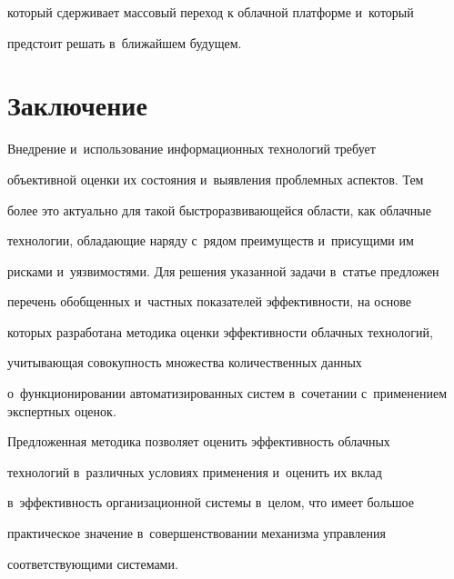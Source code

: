 который сдерживает массовый переход к облачной платформе и~который 

предстоит решать в~ближайшем будущем. 



\section{Заключение}



   Внедрение и~использование информационных технологий требует 

объективной оценки их состояния и~выявления проблемных аспектов. Тем 

более это актуально для такой быстроразвивающейся области, как облачные 

технологии, обладающие наряду с~рядом преимуществ и~присущими им 

рисками и~уязвимостями. Для решения указанной задачи в~статье предложен 

перечень обобщенных и~частных показателей эффективности, на основе 

которых разработана методика оценки эффективности облачных технологий, 

учитывающая совокупность множества количественных данных 

о~функционировании автоматизированных сис\-тем в~сочетании с~применением экспертных оценок. 

  

  Предложенная методика позволяет оценить эффективность облачных 

технологий в~различных условиях применения и~оценить их вклад 

в~эффективность организационной системы в~целом, что имеет большое 

практическое значение в~совершенствовании механизма управления 

соответствующими системами. 

     

